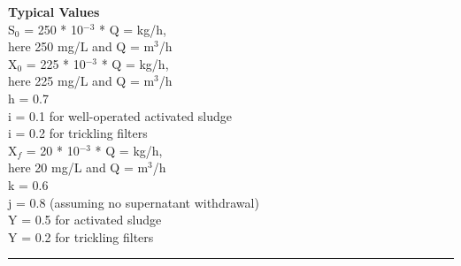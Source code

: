 \documentclass[a4paper, landscape, 8pt]{extarticle}
\begin{document}
\begin{multicols}{2}
\begin{multicols}{2}
\columnbreak
\null \vfill
\textbf{\large Typical Values}\\
S$_0$ = 250 * 10$^{-3}$ * Q = kg/h,\\
here 250 mg/L and Q = m$^3$/h\\
X$_0$ = 225 * 10$^{-3}$ * Q = kg/h,\\
here 225 mg/L and Q = m$^3$/h\\
h = 0.7\\
i = 0.1 for well-operated activated sludge\\
i = 0.2 for trickling filters\\
X$_f$ = 20 * 10$^{-3}$ * Q = kg/h,\\
here 20 mg/L and Q = m$^3$/h\\
k = 0.6\\
j = 0.8 (assuming no supernatant withdrawal)\\
Y = 0.5 for activated sludge\\
Y = 0.2 for trickling filters
\vfill \null
\end{multicols}
\end{multicols}
\hrule
\end{document}

